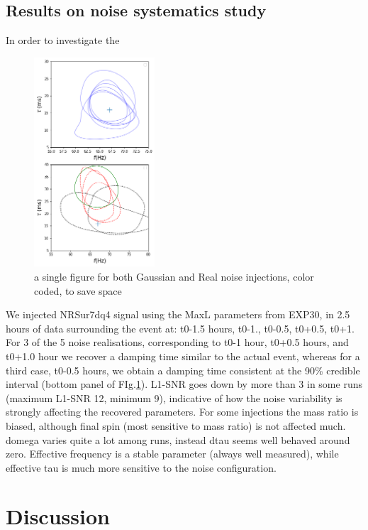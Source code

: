 \documentclass[twocolumn,prd,superscriptaddress,amsfonts,amssymb,amsmath,preprintnumbers]{revtex4-1}
\newcommand{\abhi}[1]{\textcolor{red}{[\textit{AG: #1}]}}
\begin{document}
\subsection{Results on noise systematics study}

In order to investigate the 

\begin{figure}[H]
	\includegraphics[width=0.4\textwidth]{figures/S190521g_swinjs.png}
	\caption{a single figure for both Gaussian and Real noise injections, color coded, to save space}\label{fig:21g_systematics}
\end{figure}

We injected NRSur7dq4 signal using the MaxL parameters from EXP30, in 2.5 hours of data surrounding the event at: t0-1.5 hours, t0-1., t0-0.5, t0+0.5, t0+1. For 3 of the 5 noise realisations, corresponding to t0-1 hour, t0+0.5 hours, and t0+1.0 hour we recover a damping time similar to the actual event, whereas for a third case, t0-0.5 hours, we obtain a damping time consistent at the 90\% credible interval (bottom panel of FIg.\ref{fig:21g_systematics}). L1-SNR goes down by more than 3 in some runs (maximum L1-SNR 12, minimum 9), indicative of how the noise variability is strongly affecting the recovered parameters. For some injections the mass ratio is biased, although final spin (most sensitive to mass ratio) is not affected much.  domega varies quite a lot among runs, instead dtau seems well behaved around zero. Effective frequency is a stable parameter (always well measured), while effective tau is much more sensitive to the noise configuration.  


\section{Discussion}\label{sec:discussion}

%


\end{document}
